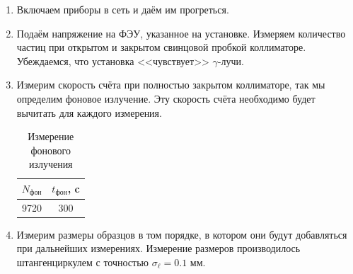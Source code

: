 \begin{enumerate}
    \item Включаем приборы в сеть и даём им прогреться.
    \item Подаём напряжение на ФЭУ, указанное на установке. Измеряем количество частиц при открытом и закрытом свинцовой пробкой коллиматоре. Убеждаемся, что установка <<чувствует>> $\gamma$-лучи.
    \item Измерим скорость счёта при полностью закрытом коллиматоре, так мы определим фоновое излучение. Эту скорость счёта необходимо будет вычитать для каждого измерения. 
    
        \begin{table}[h!]
            \begin{center}
            \begin{tabular}{|c|c|}
                \hline
                $N_{\text{фон}}$ & $t_{\text{фон}}$, c \\ \hline
                9720           & 300               \\ \hline
            \end{tabular}
            \caption{Измерение фонового излучения}
            \label{background}
        \end{center}
        \end{table}

    \item Измерим размеры образцов в том порядке, в котором они будут добавляться при дальнейших измерениях. 
    Измерение размеров производилось штангенциркулем с точностью $\sigma_{\ell} = 0.1 \text{ мм}$.
    

\end{enumerate}
